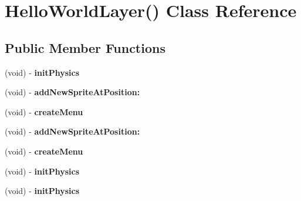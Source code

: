 \hypertarget{interface_hello_world_layer_07_08}{\section{Hello\-World\-Layer() Class Reference}
\label{interface_hello_world_layer_07_08}
}
\subsection*{Public Member Functions}
\begin{DoxyCompactItemize}
\item 
\hypertarget{interface_hello_world_layer_07_08_ab3500df9c05677d31170bcb07a82f522}{(void) -\/ {\bfseries init\-Physics}}\label{interface_hello_world_layer_07_08_ab3500df9c05677d31170bcb07a82f522}

\item 
\hypertarget{interface_hello_world_layer_07_08_a1d9f76267b1dabaa3f25f7530ef0b062}{(void) -\/ {\bfseries add\-New\-Sprite\-At\-Position\-:}}\label{interface_hello_world_layer_07_08_a1d9f76267b1dabaa3f25f7530ef0b062}

\item 
\hypertarget{interface_hello_world_layer_07_08_a638a1622a661b03a5648ddfa864ef113}{(void) -\/ {\bfseries create\-Menu}}\label{interface_hello_world_layer_07_08_a638a1622a661b03a5648ddfa864ef113}

\item 
\hypertarget{interface_hello_world_layer_07_08_a8741a3c83a9f7d9d177dae76464e37e9}{(void) -\/ {\bfseries add\-New\-Sprite\-At\-Position\-:}}\label{interface_hello_world_layer_07_08_a8741a3c83a9f7d9d177dae76464e37e9}

\item 
\hypertarget{interface_hello_world_layer_07_08_a638a1622a661b03a5648ddfa864ef113}{(void) -\/ {\bfseries create\-Menu}}\label{interface_hello_world_layer_07_08_a638a1622a661b03a5648ddfa864ef113}

\item 
\hypertarget{interface_hello_world_layer_07_08_ab3500df9c05677d31170bcb07a82f522}{(void) -\/ {\bfseries init\-Physics}}\label{interface_hello_world_layer_07_08_ab3500df9c05677d31170bcb07a82f522}

\item 
\hypertarget{interface_hello_world_layer_07_08_ab3500df9c05677d31170bcb07a82f522}{(void) -\/ {\bfseries init\-Physics}}\label{interface_hello_world_layer_07_08_ab3500df9c05677d31170bcb07a82f522}


\end{DoxyCompactItemize}
